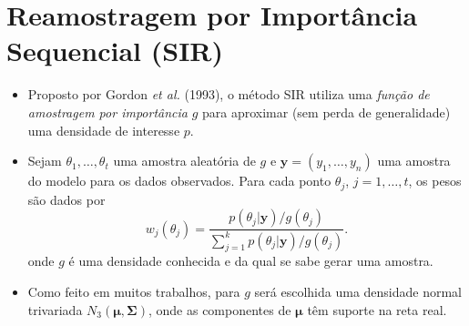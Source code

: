 \documentclass[9pt]{beamer}
\begin{document}
\section{Reamostragem por Importância Sequencial (SIR)}
\begin{frame}
\begin{itemize}
\justifying	
\item Proposto por Gordon \textit{et al.} (1993), o método SIR utiliza uma \textit{função de amostragem por importância} $g$ para aproximar (sem perda de generalidade) uma densidade de interesse $p$.

\item Sejam $\theta_1, \ldots, \theta_t$ uma amostra aleatória de $g$ e $\bm{y} = (y_1, \ldots, y_n)$ uma amostra do modelo para os dados observados. Para cada ponto $\theta_j$, $j = 1, \ldots, t$, os pesos são dados por
\begin{equation}\label{eq:sir_wei}
w_j(\theta_j) = \dfrac{p(\theta_j | \bm{y}) / g(\theta_j)}{\sum_{j=1}^{k} p(\theta_j | \bm{y}) / g(\theta_j)}.
\end{equation}
onde $g$ é uma densidade conhecida e da qual se sabe gerar uma amostra. 
\item Como feito em muitos trabalhos, para $g$ será escolhida uma densidade normal trivariada $N_3(\bm{\mu}, \bm{\Sigma})$, onde as componentes de $\bm{\mu}$ têm suporte na reta real.
\end{itemize}
\end{frame}
\end{document}
